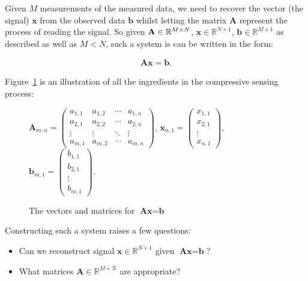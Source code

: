 \documentclass[titlepage,oneside, 12pt]{book}
\theoremstyle{break}
\begin{document}
Given $M$ measurements of the measured data, we need to recover the vector (the signal) $\textbf{x}$ from the observed data $\textbf{b}$ whilst letting the matrix $\textbf{A}$ represent the process of reading the signal. So given $\textbf{A} \space \in \mathbb{R}^{M \times N}$,  $\textbf{x} \in \mathbb{R}^{N \times 1}$, $\textbf{b} \in \mathbb{R}^{M \times 1}$ as described as well as $M < N$, such a system is can be written in the form:

\begin{equation}
\begin{gathered}
\textbf{Ax} = \textbf{b}.
\end{gathered}
\end{equation}

Figure~\ref{fig:AxForm} is an illustration of all the ingredients in the compressive sensing process:

\begin{figure}[H]
\centering
$
\textbf{A}_{m, n} = \begin{pmatrix}
  a_{1,1} & a_{1,2} & \cdots & a_{1,n} \\
  a_{2,1} & a_{2,2} & \cdots & a_{2,n} \\
  \vdots  & \vdots  & \ddots & \vdots  \\
  a_{m,1} & a_{m,2} & \cdots & a_{m,n} 
\end{pmatrix}  
$,
$
\textbf{x}_{n, 1} = \begin{pmatrix}
x_{1,1} \\
x_{2,1} \\
\vdots  \\
x_{n,1} 
\end{pmatrix}  
$,
$
\textbf{b}_{m, 1} = \begin{pmatrix}
b_{1,1} \\
b_{2,1} \\
\vdots  \\
b_{m,1} 
\end{pmatrix}  
$.

\caption{The vectors and matrices for $\textbf{Ax}= \textbf{b}$}
\label{fig:AxForm}
\end{figure}


Constructing such a system raises a few questions:
\begin{itemize}
\item Can we reconstruct signal $\textbf{x} \in \mathbb{R}^{N \times 1}$ given {$\textbf{Ax}=\textbf{b}$}? 
\item What matrices $\textbf{A} \in \mathbb{R}^{M \times N}$ are appropriate?
\end{itemize}
\end{document}
